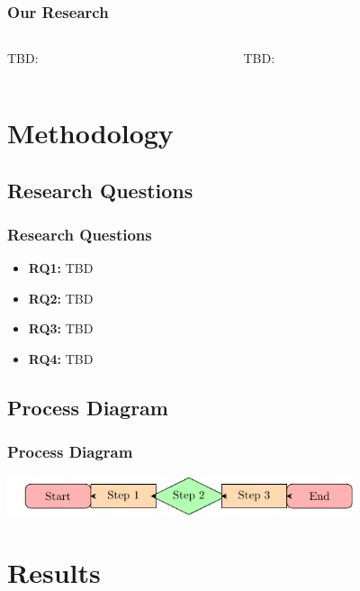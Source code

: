 \documentclass{beamer}
\begin{document}
\begin{frame}
  \frametitle{Our Research}
  \begin{columns}
    \begin{column}{0.5\textwidth}

      TBD:

    \end{column}
    \begin{column}{0.5\textwidth}
      TBD:
    \end{column}
  \end{columns}

\end{frame}

\section{Methodology}

\subsection{Research Questions}
\begin{frame}
  \frametitle{Research Questions}
  \begin{itemize}
  \item<1-> \textbf{RQ1:} TBD
  \item<2-> \textbf{RQ2:} TBD
  \item<3-> \textbf{RQ3:} TBD
  \item<4-> \textbf{RQ4:} TBD

  \end{itemize}
\end{frame}

\subsection{Process Diagram}
\begin{frame}
  \frametitle{Process Diagram}
  \includegraphics[width=4in]{figures/methodology.pdf}
\end{frame}
\section{Results}
\end{document}
